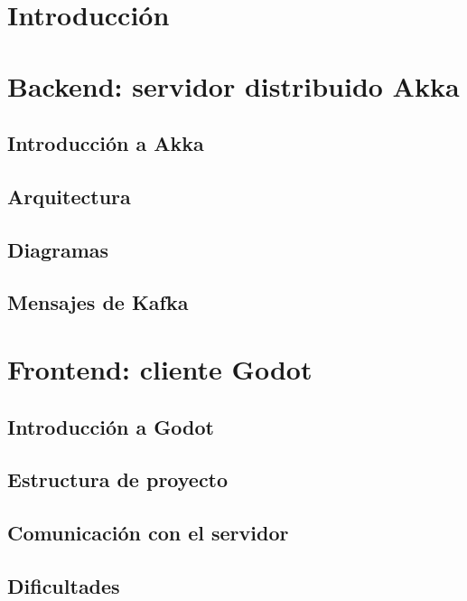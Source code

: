 \documentclass[12pt]{article}
\begin{document}


\newpage

\section{Introducción}



\section{Backend: servidor distribuido Akka}

\subsection{Introducción a Akka}

\subsection{Arquitectura}

\subsection{Diagramas}

\subsection{Mensajes de Kafka}


\section{Frontend: cliente Godot}

\subsection{Introducción a Godot}

\subsection{Estructura de proyecto}

\subsection{Comunicación con el servidor}

\subsection{Dificultades}
\end{document}
